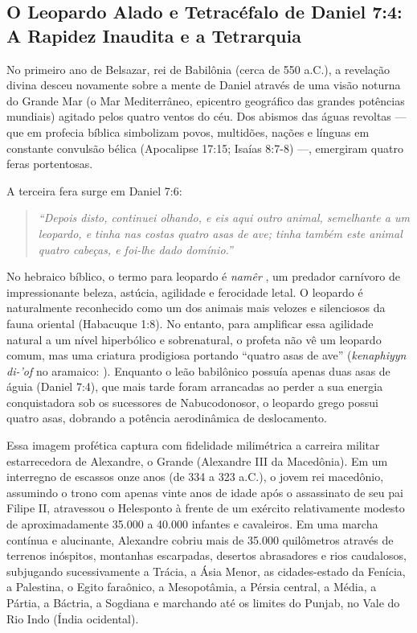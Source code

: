 \subsection{O Leopardo Alado e Tetracéfalo de Daniel 7:4: A Rapidez Inaudita e a Tetrarquia}


No primeiro ano de Belsazar, rei de Babilônia (cerca de 550 a.C.), a revelação divina desceu novamente sobre a mente de Daniel através de uma visão noturna do Grande Mar (o Mar Mediterrâneo, epicentro geográfico das grandes potências mundiais) agitado pelos quatro ventos do céu. Dos abismos das águas revoltas — que em profecia bíblica simbolizam povos, multidões, nações e línguas em constante convulsão bélica (Apocalipse 17:15; Isaías 8:7-8) —, emergiram quatro feras portentosas.

A terceira fera surge em Daniel 7:6:

\begin{quote}
\itshape ``Depois disto, continuei olhando, e eis aqui outro animal, semelhante a um leopardo, e tinha nas costas quatro asas de ave; tinha também este animal quatro cabeças, e foi-lhe dado domínio.''
\end{quote}


No hebraico bíblico, o termo para leopardo é \textit{namêr} , um predador carnívoro de impressionante beleza, astúcia, agilidade e ferocidade letal. O leopardo é naturalmente reconhecido como um dos animais mais velozes e silenciosos da fauna oriental (Habacuque 1:8). No entanto, para amplificar essa agilidade natural a um nível hiperbólico e sobrenatural, o profeta não vê um leopardo comum, mas uma criatura prodigiosa portando ``quatro asas de ave'' (\textit{kenaphiyyn di-'of} no aramaico: ). Enquanto o leão babilônico possuía apenas duas asas de águia (Daniel 7:4), que mais tarde foram arrancadas ao perder a sua energia conquistadora sob os sucessores de Nabucodonosor, o leopardo grego possui quatro asas, dobrando a potência aerodinâmica de deslocamento.

Essa imagem profética captura com fidelidade milimétrica a carreira militar estarrecedora de Alexandre, o Grande (Alexandre III da Macedônia). Em um interregno de escassos onze anos (de 334 a 323 a.C.), o jovem rei macedônio, assumindo o trono com apenas vinte anos de idade após o assassinato de seu pai Filipe II, atravessou o Helesponto à frente de um exército relativamente modesto de aproximadamente 35.000 a 40.000 infantes e cavaleiros. Em uma marcha contínua e alucinante, Alexandre cobriu mais de 35.000 quilômetros através de terrenos inóspitos, montanhas escarpadas, desertos abrasadores e rios caudalosos, subjugando sucessivamente a Trácia, a Ásia Menor, as cidades-estado da Fenícia, a Palestina, o Egito faraônico, a Mesopotâmia, a Pérsia central, a Média, a Pártia, a Báctria, a Sogdiana e marchando até os limites do Punjab, no Vale do Rio Indo (Índia ocidental).


